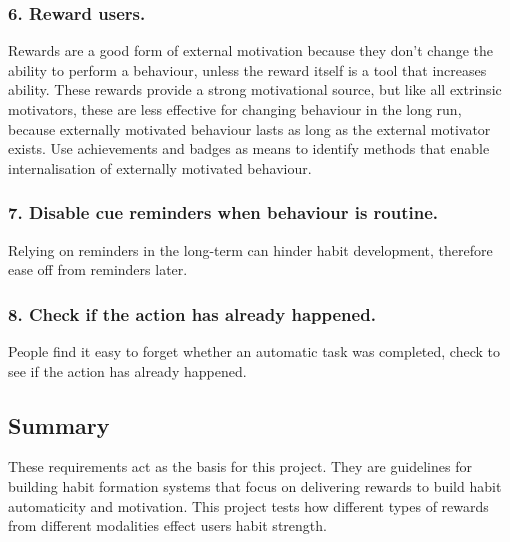 \subsubsection*{6. Reward users.}
Rewards are a good form of external motivation because they don't change the ability to perform a behaviour, unless the reward itself is a tool that increases ability. These rewards provide a strong motivational source, but like all extrinsic motivators, these are less effective for changing behaviour in the long run, because externally motivated behaviour lasts as long as the external motivator exists. Use achievements and badges as means to identify methods that enable internalisation of externally motivated behaviour.

\subsubsection*{7. Disable cue reminders when behaviour is routine.}
Relying on reminders in the long-term can hinder habit development, therefore ease off from reminders later.

\subsubsection*{8. Check if the action has already happened.}
People find it easy to forget whether an automatic task was completed, check to see if the action has already happened.



\subsection*{Summary}

These requirements act as the basis for this project. They are guidelines for building habit formation systems that focus on delivering rewards to build habit automaticity and motivation. This project tests how different types of rewards from different modalities effect users habit strength.
